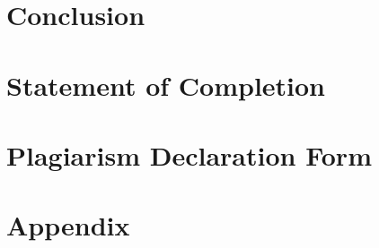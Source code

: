 \documentclass[11pt,a4paper,final]{article}
\begin{document}
	\section{Conclusion}
	\label{Conc}
	
	\section{Statement of Completion}
	\label{SoC}
	
	\section{Plagiarism Declaration Form}
	\label{PlagForm}
	
	\section{Appendix}
	\label{Appendix}
	\lstset{style=mystyleR}
\end{document}
